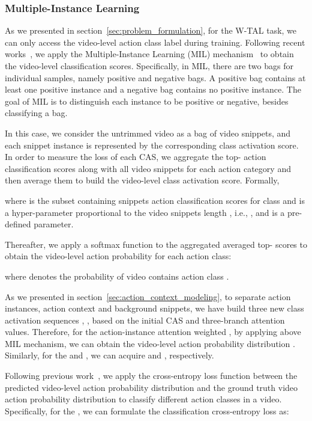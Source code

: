 \documentclass[journal,comsoc]{IEEEtran}
\begin{document}
\subsubsection{Multiple-Instance Learning}
\par As we presented in section~\ref{sec:problem_formulation}, for the W-TAL task, we can only access the video-level action class label during training. Following recent works~\cite{WTALC, MAAN, BASNet, EMMIL}, we apply the Multiple-Instance Learning (MIL) mechanism~\cite{MIL} to obtain the video-level classification scores. Specifically, in MIL, there are two bags for individual samples, namely positive and negative bags. A positive bag contains at least one positive instance and a negative bag contains no positive instance. The goal of MIL is to distinguish each instance to be positive or negative, besides classifying a bag.
\par In this case, we consider the untrimmed video  as a bag of video snippets, and each snippet instance is represented by the corresponding class activation score. In order to measure the loss of each CAS, we aggregate the top- action classification scores along with all video snippets for each action category and then average them to build the video-level class activation score. Formally, 

where  is the subset containing  snippets action classification scores for class   and  is a hyper-parameter proportional to the video snippets length , i.e., , and  is a pre-defined parameter. 
\par Thereafter, we apply a softmax function to the aggregated averaged top- scores to obtain the video-level action probability for each action class:

where  denotes the probability of video  contains action class .

\par As we presented in section~\ref{sec:action_context_modeling}, to separate action instances, action context and background snippets, we have build three new class activation sequences , ,  based on the initial CAS and three-branch attention values. Therefore, for the action-instance attention weighted , by applying above MIL mechanism, we can obtain the video-level action probability distribution . Similarly, for the  and , we can acquire  and , respectively.

\par Following previous work~\cite{STPN, WTALC, BASNet, EMMIL, ACSNET}, we apply the cross-entropy loss function between the predicted video-level action probability distribution  and the ground truth video action probability distribution  to classify different action classes in a video. Specifically, for the , we can formulate the classification cross-entropy loss as:
\end{document}
